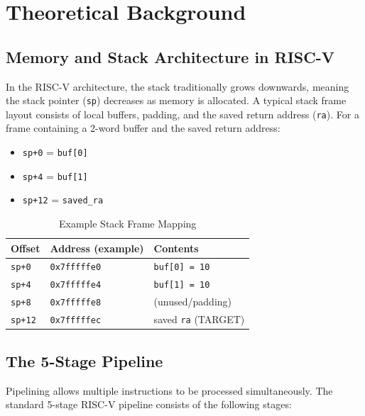 \chapter{Theoretical Background}

\section{Memory and Stack Architecture in RISC-V}
In the RISC-V architecture, the stack traditionally grows downwards, meaning the stack pointer (\texttt{sp}) decreases as memory is allocated. A typical stack frame layout consists of local buffers, padding, and the saved return address (\texttt{ra}). For a frame containing a 2-word buffer and the saved return address:
\begin{itemize}
    \item \texttt{sp+0} = \texttt{buf[0]}
    \item \texttt{sp+4} = \texttt{buf[1]}
    \item \texttt{sp+12} = \texttt{saved\_ra}
\end{itemize}

\begin{table}[h]
\caption{Example Stack Frame Mapping}
\centering
\begin{tabular}{|l|l|l|}
\hline
\textbf{Offset} & \textbf{Address (example)} & \textbf{Contents} \\
\hline
\texttt{sp+0} & \texttt{0x7fffffe0} & \texttt{buf[0] = 10} \\
\texttt{sp+4} & \texttt{0x7fffffe4} & \texttt{buf[1] = 10} \\
\texttt{sp+8} & \texttt{0x7fffffe8} & (unused/padding) \\
\texttt{sp+12} & \texttt{0x7fffffec} & saved \texttt{ra} (TARGET) \\
\hline
\end{tabular}
\label{tab:stack_map}
\end{table}

\section{The 5-Stage Pipeline}
Pipelining allows multiple instructions to be processed simultaneously. The standard 5-stage RISC-V pipeline consists of the following stages:

